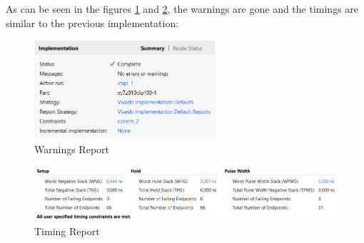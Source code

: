 As can be seen in the figures \ref{fig:WR3} and \ref{fig:TR3}, the warnings are gone and the timings are similar to the previous implementation:

\begin{figure}[H]
    \centering
    \includegraphics[width=0.6\textwidth]{img/Chapter5/ImplementationAutomatic.png}
    \caption{Warnings Report}
    \label{fig:WR3}
\end{figure}

\begin{figure}[H]
    \centering
    \includegraphics[width=1\textwidth]{img/Chapter5/ImplementationAutomaticResults.png}
    \caption{Timing Report}
    \label{fig:TR3}
\end{figure}